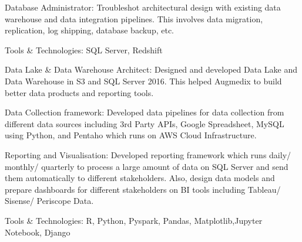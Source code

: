 \documentclass[letterpaper]{deedy-resume} %
\begin{document}
\begin{minipage}[t]{0.66\textwidth}
\sectionspace %


\begin{tightitemize}
\item Database Administrator:
Troubleshot architectural design with existing data warehouse and data integration pipelines. This involves data migration, replication, log shipping, database backup, etc.
\item Tools & Technologies: SQL Server, Redshift

\end{tightitemize}

\sectionspace %


\begin{tightitemize}
\item Data Lake & Data Warehouse Architect:
Designed and developed Data Lake and Data Warehouse in S3 and SQL Server 2016. This helped Augmedix to build better data products and reporting tools.

\item Data Collection framework:
Developed data pipelines for data collection from different data sources including 3rd Party APIs, Google Spreadsheet, MySQL using Python, and Pentaho which runs on AWS Cloud Infrastructure.
\item Reporting and Visualisation:
Developed reporting framework which runs daily/ monthly/ quarterly to process a large amount of data on SQL Server and send them automatically to different stakeholders. Also, design data models and prepare dashboards for different stakeholders on BI tools including Tableau/ Sisense/ Periscope Data.
\item Tools & Technologies: R, Python, Pyspark, Pandas, Matplotlib,Jupyter Notebook, Django
\end{tightitemize}

\end{minipage} %


\end{document}
